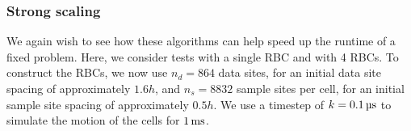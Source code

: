 \subsubsection{Strong scaling}

We again wish to see how these algorithms can help speed up the runtime of
a fixed problem. Here, we consider tests with a single RBC and with 4 RBCs.
To construct the RBCs, we now use $n_d=864$ data sites, for an initial data
site spacing of approximately $1.6h$, and $n_s=8832$ sample sites per cell, for
an initial sample site spacing of approximately $0.5h$. We use a timestep of
$k=0.1\us$ to simulate the motion of the cells for $1\ms$.


